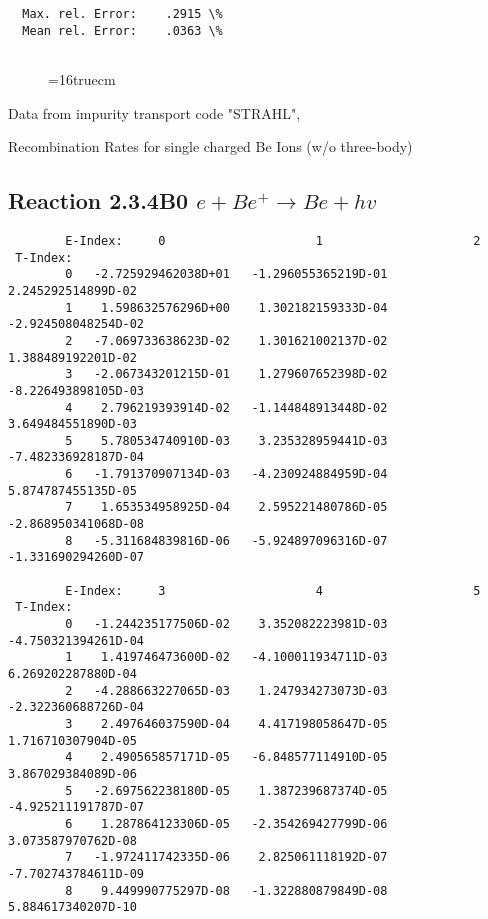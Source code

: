 \documentclass[12pt,dvipdfmx]{article}
\begin{document}
{\begin{small}
\begin{verbatim}
  Max. rel. Error:    .2915 \%
  Mean rel. Error:    .0363 \%


\end{verbatim}\end{small}
\begin{figure} \label{2.3.2C}
\epsfxsize=16truecm
\end{figure}
\newpage
Data from impurity transport code "STRAHL", \cite{kn:Behringer}

  Recombination Rates for single charged Be Ions (w/o three-body)

\subsection{
Reaction 2.3.4B0  $e + Be^+ \rightarrow Be + hv$
}


\begin{small}\begin{verbatim}
        E-Index:     0                     1                     2
 T-Index:
        0   -2.725929462038D+01   -1.296055365219D-01    2.245292514899D-02
        1    1.598632576296D+00    1.302182159333D-04   -2.924508048254D-02
        2   -7.069733638623D-02    1.301621002137D-02    1.388489192201D-02
        3   -2.067343201215D-01    1.279607652398D-02   -8.226493898105D-03
        4    2.796219393914D-02   -1.144848913448D-02    3.649484551890D-03
        5    5.780534740910D-03    3.235328959441D-03   -7.482336928187D-04
        6   -1.791370907134D-03   -4.230924884959D-04    5.874787455135D-05
        7    1.653534958925D-04    2.595221480786D-05   -2.868950341068D-08
        8   -5.311684839816D-06   -5.924897096316D-07   -1.331690294260D-07

        E-Index:     3                     4                     5
 T-Index:
        0   -1.244235177506D-02    3.352082223981D-03   -4.750321394261D-04
        1    1.419746473600D-02   -4.100011934711D-03    6.269202287880D-04
        2   -4.288663227065D-03    1.247934273073D-03   -2.322360688726D-04
        3    2.497646037590D-04    4.417198058647D-05    1.716710307904D-05
        4    2.490565857171D-05   -6.848577114910D-05    3.867029384089D-06
        5   -2.697562238180D-05    1.387239687374D-05   -4.925211191787D-07
        6    1.287864123306D-05   -2.354269427799D-06    3.073587970762D-08
        7   -1.972411742335D-06    2.825061118192D-07   -7.702743784611D-09
        8    9.449990775297D-08   -1.322880879849D-08    5.884617340207D-10


\end{verbatim}
\end{small}}
\end{document}
